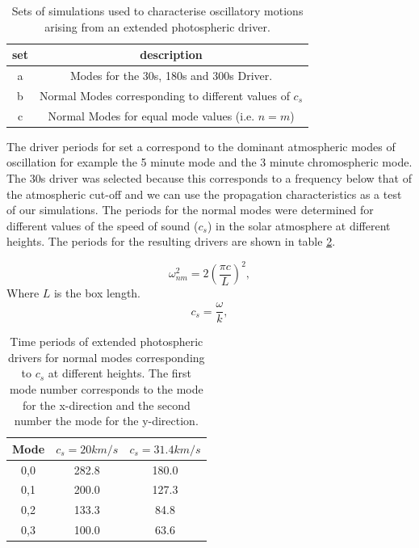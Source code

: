 \documentclass[authoryear,final,1p]{elsarticle}
\begin{document}
\begin{table}\label{simsetstab}
\centering
\begin{tabular}{c c }
\hline
set   &  description\\
\hline
a &  Modes for the 30s, 180s and 300s Driver. \\
\hline
b &  Normal Modes corresponding to different values of $c_s$ \\
\hline
c & Normal Modes for equal mode values (i.e. $n=m$)  \\
\hline
\end{tabular} 
\caption{Sets of simulations used to characterise oscillatory motions arising from an extended photospheric driver.}
\end{table}

The driver periods for set a correspond to the dominant atmospheric modes of oscillation for example the 5 minute mode and the 3 minute chromospheric mode. The 30s driver was selected because this corresponds to a frequency below that of the atmospheric cut-off and we can use the propagation characteristics as a test of our simulations. The periods for the normal modes were determined for different values of the speed of sound ($c_s$) in the solar atmosphere at different heights. The periods for the resulting drivers are shown in table \ref{simperiods}.

\begin{equation}\label{normmodedrvfreq}
\omega_{nm}^{2}= 2\left(   \frac{\pi c}{L} \right) ^{2},
\end{equation}
Where $L$ is the box length.
\begin{equation}\label{normmodecs}
c_s= \frac{\omega}{k},
\end{equation}

\begin{table}\label{simperiods}
\centering
\begin{tabular}{c c c }
\hline
Mode   &  $c_s=20km/s$ &  $c_s=31.4km/s$ \\
\hline
0,0 & 282.8 & 180.0 \\
\hline
0,1 & 200.0 & 127.3  \\
\hline
0,2 & 133.3 & 84.8  \\
\hline
0,3 & 100.0 & 63.6  \\
\hline
\end{tabular} 
\caption{Time periods of extended photospheric drivers for normal modes corresponding to $c_s$ at different heights. The first mode number corresponds to the mode for the x-direction and the second number the mode for the y-direction.}
\end{table}
\end{document}
